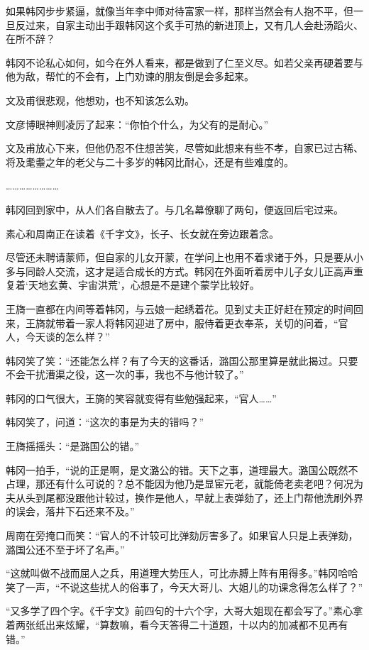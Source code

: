 如果韩冈步步紧逼，就像当年李中师对待富家一样，那样当然会有人抱不平，但一旦反过来，自家主动出手跟韩冈这个炙手可热的新进顶上，又有几人会赴汤蹈火、在所不辞？

韩冈不论私心如何，如今在外人看来，都是做到了仁至义尽。如若父亲再硬着要与他为敌，帮忙的不会有，上门劝谏的朋友倒是会多起来。

文及甫很悲观，他想劝，也不知该怎么劝。

文彦博眼神则凌厉了起来：“你怕个什么，为父有的是耐心。”

文及甫放心下来，但他仍忍不住想苦笑，尽管如此想来有些不孝，自家已过古稀、将及耄耋之年的老父与二十多岁的韩冈比耐心，还是有些难度的。

……………………

韩冈回到家中，从人们各自散去了。与几名幕僚聊了两句，便返回后宅过来。

素心和周南正在读着《千字文》，长子、长女就在旁边跟着念。

尽管还未聘请蒙师，但自家的儿女开蒙，在学问上也用不着求诸于外，只是要从小多与同龄人交流，这才是适合成长的方式。韩冈在外面听着房中儿子女儿正高声重复着‘天地玄黄、宇宙洪荒’，心想是不是建个蒙学比较好。

王旖一直都在内间等着韩冈，与云娘一起绣着花。见到丈夫正好赶在预定的时间回来，王旖就带着一家人将韩冈迎进了房中，服侍着更衣奉茶，关切的问着，“官人，今天谈的怎么样？”

韩冈笑了笑：“还能怎么样？有了今天的这番话，潞国公那里算是就此揭过。只要不会干扰漕渠之役，这一次的事，我也不与他计较了。”

韩冈的口气很大，王旖的笑容就变得有些勉强起来，“官人……”

韩冈笑了，问道：“这次的事是为夫的错吗？”

王旖摇摇头：“是潞国公的错。”

韩冈一拍手，“说的正是啊，是文潞公的错。天下之事，道理最大。潞国公既然不占理，那还有什么可说的？总不能因为他乃是显宦元老，就能倚老卖老吧？何况为夫从头到尾都没跟他计较过，换作是他人，早就上表弹劾了，还上门帮他洗刷外界的误会，落井下石还来不及。”

周南在旁掩口而笑：“官人的不计较可比弹劾厉害多了。如果官人只是上表弹劾，潞国公还不至于坏了名声。”

“这就叫做不战而屈人之兵，用道理大势压人，可比赤膊上阵有用得多。”韩冈哈哈笑了一声，“不说这些扰人的俗事了，今天大哥儿、大姐儿的功课念得怎么样了？”

“又多学了四个字。《千字文》前四句的十六个字，大哥大姐现在都会写了。”素心拿着两张纸出来炫耀，“算数嘛，看今天答得二十道题，十以内的加减都不见再有错。”

